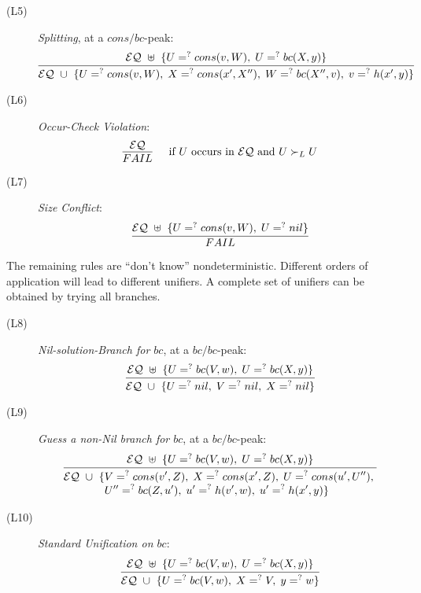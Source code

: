 \documentclass[11pt]{article}
\newcommand{\ueq}{=_{}^?}
\newcommand{\EQ}{\mathcal{EQ}}
\begin{document}
\begin{description}
    \item[(L5)] {\em Splitting}, at a $cons/bc$-peak:
        \[\infer
            {\EQ ~ \cup ~ \{ U \ueq cons(v, W) , \; X \ueq cons(x', X''), \;
                             W \ueq bc(X'', v), \; v \ueq h(x', y) \}}
            {\EQ ~ \uplus ~ \{ U \ueq cons(v, W), \;
                               U \ueq bc(X, y) \}}
        \]

    \item[(L6)] {\em Occur-Check Violation}:
        \[\infer[\quad \text{if } U \text{ occurs in } \EQ
                 \text{ and }  U \succ_L U]
            { FAIL }
            { \EQ }
        \]

    \item[(L7)] {\em Size Conflict}:
        \[\infer
            { FAIL }
            { \EQ ~ \uplus ~ \{ U \ueq cons(v, W), \; U \ueq nil \} }
        \]
\end{description}

The remaining rules are ``don't know'' nondeterministic. Different orders of
application will lead to different unifiers. A complete set of unifiers can
be obtained by trying all branches.
\begin{description}
    \item[(L8)] {\em Nil-solution-Branch for $bc$\/}, at a $bc/bc$-peak:
        \[\infer
            {\EQ ~ \cup ~ \{ U \ueq nil, \; V \ueq nil, \; X \ueq nil \}}
            {\EQ ~ \uplus ~ \{ U \ueq bc(V, w), \; U \ueq bc(X, y) \}}
        \]

    \item[(L9)] {\em Guess a non-Nil branch for $bc$\/}, at a $bc/bc$-peak:
        \[\infer
            {\begin{aligned}
                \EQ ~ \cup ~ \{
                & V \ueq cons(v', Z), \; X \ueq cons(x', Z), \;
                  U \ueq cons(u', U''), \; \\[-4pt]
                & U'' \ueq bc(Z, u'), \; u' \ueq h(v', w), \; u' \ueq h(x', y) \}
            \end{aligned}}
            {\EQ ~ \uplus ~ \{ U \ueq bc(V, w), \; U \ueq bc(X, y) \}}
        \]

    \item[(L10)] {\em Standard Unification on $bc$}:
        \[\infer
            {\EQ ~ \cup ~ \{ U \ueq bc(V, w), \; X \ueq V, \; y \ueq w \}}
            {\EQ ~ \uplus ~ \{ U \ueq bc(V, w), \; U \ueq bc(X, y) \}}
        \]
\end{description}

\newpage
\end{document}
